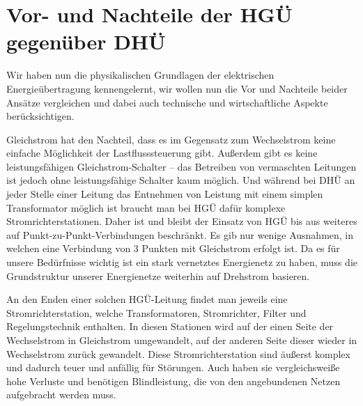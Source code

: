 \section{Vor- und Nachteile der HGÜ gegenüber DHÜ}
Wir haben nun die physikalischen Grundlagen der elektrischen Energieübertragung kennengelernt, wir wollen nun die Vor und Nachteile beider Ansätze vergleichen und dabei auch technische und wirtschaftliche Aspekte berücksichtigen.

Gleichstrom hat den Nachteil, dass es im Gegensatz zum Wechselstrom keine einfache Möglichkeit der Lastflusssteuerung gibt.
Außerdem gibt es keine leistungsfähigen Gleichstrom-Schalter – das Betreiben von vermaschten Leitungen ist jedoch ohne leistungsfähige Schalter kaum möglich.\cite{Schymroch} %
Und während bei DHÜ an jeder Stelle einer Leitung das Entnehmen von Leistung mit einem simplen Transformator möglich ist braucht man bei HGÜ dafür komplexe Stromrichterstationen.\cite{Schymroch}
Daher ist und bleibt der Einsatz von HGÜ bis aus weiteres auf Punkt-zu-Punkt-Verbindungen beschränkt. Es gib nur wenige Ausnahmen, in welchen eine Verbindung von 3 Punkten mit Gleichstrom erfolgt ist. %
Da es für unsere Bedürfnisse wichtig ist ein stark vernetztes Energienetz zu haben, muss die Grundstruktur %
unserer Energienetze weiterhin auf Drehstrom basieren.

An den Enden einer solchen HGÜ-Leitung findet man jeweils eine Stromrichterstation, welche Transformatoren, Stromrichter, Filter und Regelungstechnik enthalten.\cite{Schymroch} In diesen Stationen wird auf der einen Seite der Wechselstrom in Gleichstrom umgewandelt, auf der anderen Seite dieser wieder in Wechselstrom zurück gewandelt.
Diese Stromrichterstation sind äußerst komplex und dadurch teuer und anfällig für Störungen. Auch haben sie vergleichsweiße hohe Verluste und benötigen Blindleistung, die von den angebundenen Netzen aufgebracht werden muss.

